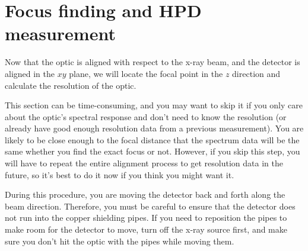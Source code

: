 \section{Focus finding and HPD measurement\label{sec:focalign}}

Now that the optic is aligned with respect to the x-ray beam, and the detector
is aligned in the $xy$ plane, we will locate the focal point in the $z$
direction and calculate the resolution of the optic.

This section can be time-consuming, and you may want to skip it if you only care
about the optic's spectral response and don't need to know the resolution (or
already have good enough resolution data from a previous measurement). You are
likely to be close enough to the focal distance that the spectrum data will be
the same whether you find the exact focus or not. However, if you skip this
step, you will have to repeat the entire alignment process to get resolution
data in the future, so it's best to do it now if you think you might want it.

During this procedure, you are moving the detector back and forth along the beam
direction. Therefore, you must be careful to ensure that the detector does not
run into the copper shielding pipes. If you need to reposition the pipes to make
room for the detector to move, turn off the x-ray source first, and make sure
you don't hit the optic with the pipes while moving them.

